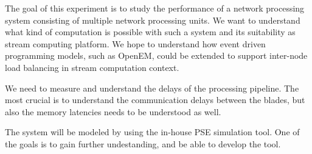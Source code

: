 The goal of this experiment is to study the performance of a network processing system consisting of multiple network processing units. We want to understand what kind of computation is possible with such a system and its suitability as stream computing platform. We hope to understand how event driven programming models, such as OpenEM, could be extended to support inter-node load balancing in stream computation context.

We need to measure and understand the delays of the processing pipeline. The most crucial is to understand the communication delays between the blades, but also the memory latencies needs to be understood as well.

The system will be modeled by using the in-house PSE simulation tool. One of the goals is to gain further undestanding, and be able to develop the tool.

